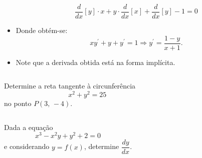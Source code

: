 \begin{frame}
\begin{columns}[onlytextwidth]
\begin{column}{0.49\textwidth}
\begin{itemize}
        \begin{equation*}
          \frac{d}{dx}\left[y\right]\cdot x + y\cdot\frac{d}{dx}\left[x\right] + \frac{d}{dx}\left[y\right] - 1 = 0
        \end{equation*}
        \item Donde obtém-se:
        \begin{equation*}
          xy^{\prime} + y  + y^\prime = 1 \Rightarrow y^{\prime} = \frac{1-y}{x+1}.
        \end{equation*}
        \item Note que a derivada obtida está na forma implícita.
      \end{itemize}
    \end{column}
  \end{columns}
\end{frame}

\begin{frame}
  \begin{columns}[onlytextwidth]
    \begin{column}{0.5\textwidth}\vspace*{-0.5cm}
      \begin{example}
        Determine a reta tangente à circunferência
        \begin{equation*}
          x^{2} + y^{2} = 25
        \end{equation*}
        no ponto $P(3,\,-4)$.
      \end{example}
    \end{column}
    \begin{column}{0.5\textwidth}
      \begin{figure}
      \end{figure}
    \end{column}
  \end{columns}
\end{frame}

\begin{frame}
  \begin{columns}[onlytextwidth]
    \vspace*{-0.5cm}
      \begin{example}
        Dada a equação $$x^3-x^2y + y^2 + 2 = 0$$ e considerando $y=f(x)$, determine $\dfrac{dy}{dx}$.
      \end{example}
    \hfill
  \end{columns}
\end{frame}

